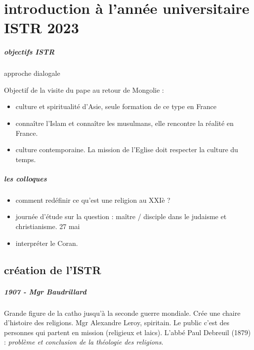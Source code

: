 \chapter{introduction à l'année universitaire ISTR 2023}

\paragraph{objectifs ISTR} approche dialogale

Objectif de la visite du pape au retour de Mongolie : 
\begin{singlequote}
    
\end{singlequote}

\begin{itemize}
    \item culture et spiritualité d'Asie, seule formation de ce type en France
    \item connaître l'Islam et connaître les musulmans, elle rencontre la réalité en France. 
    \item culture contemporaine. La mission de l'Eglise doit respecter la culture du temps.
\end{itemize}


\paragraph{les colloques}

\begin{itemize}
    \item comment redéfinir ce qu'est une religion au XXIè ? 
    \item journée d'étude sur la question : maître / disciple dans le judaisme et christianisme. 27 mai 
    \item interpréter le Coran. 
\end{itemize}



\section{création de l'ISTR}

\paragraph{1907 - Mgr Baudrillard} Grande figure de la catho jusqu'à la seconde guerre mondiale. Crée une chaire d'histoire des religions. Mgr Alexandre Leroy, spiritain. Le public c'est des personnes qui partent en mission (religieux et laics).
L'abbé Paul Debreuil (1879) : \textit{problème et conclusion de la théologie des religions}.

